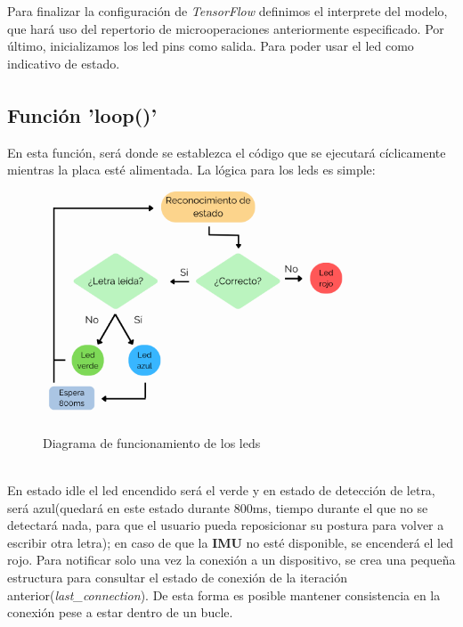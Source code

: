 Para finalizar la configuración de \textit{TensorFlow} definimos el interprete del modelo, que hará
uso del repertorio de microoperaciones anteriormente especificado.\newline
Por último, inicializamos los led pins como salida. Para poder usar el led como
indicativo de estado.

\subsection{Función 'loop()'\textsuperscript{\cite{andriyadimw,petewardenmw}}}
En esta función, será donde se establezca el código que se ejecutará cíclicamente
mientras la placa esté alimentada.\newline
La lógica para los leds es simple:
\begin{figure}[h]
    \centering
    \includegraphics[width=0.8\textwidth]{capturas/diagramaLeds.png}\\[-0,20cm]
    \caption{Diagrama de funcionamiento de los leds}
\end{figure}\\
En estado idle el led
encendido será el verde y en estado de detección de letra, será azul(quedará en este estado
durante 800ms, tiempo durante el que no se detectará nada, para que el usuario pueda
reposicionar su postura para volver a escribir otra letra); en caso de que la \textbf{IMU}
no esté disponible, se encenderá el led rojo.\newline
Para notificar solo una vez la conexión a un dispositivo,
se crea una pequeña estructura para consultar el estado de conexión de la iteración
anterior(\textit{last\_connection}). De esta forma es posible mantener consistencia
en la conexión pese a estar dentro de un bucle.\newline
